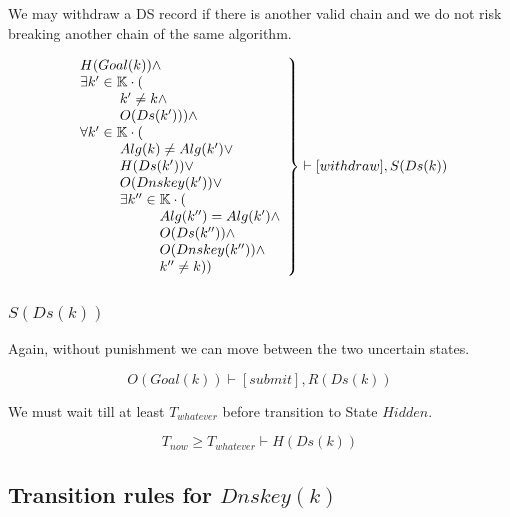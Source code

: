 \documentclass[twoside,english, a4paper]{article}
\newcommand{\mathbox}[1]{#1}
\begin{document}
\mathbox{

	We may withdraw a DS record if there is another valid chain and
	we do not risk breaking another chain of the same algorithm.

	\begin{equation}
		\left.
		\begin{array}{l}
\hskip 0cm			H(Goal(k)) \wedge \\
\hskip 0cm			\exists k' \in \mathbb{K} \cdot (\\
\hskip 1cm				k' \neq k \wedge \\
\hskip 1cm				O(Ds(k'))) \wedge \\
\hskip 0cm				\forall k' \in \mathbb{K} \cdot ( \\
\hskip 1cm					Alg(k) \neq Alg(k') \vee \\
\hskip 1cm					H(Ds(k')) \vee \\
\hskip 1cm					O(Dnskey(k')) \vee \\
\hskip 1cm					\exists k'' \in \mathbb{K} \cdot (\\
\hskip 2cm 						Alg(k'')=Alg(k') \wedge \\
\hskip 2cm 						O(Ds(k'')) \wedge \\
\hskip 2cm 						O(Dnskey(k'')) \wedge \\
\hskip 2cm 						k'' \neq k))
		\end{array}
		\right\} \vdash [withdraw], S(Ds(k)) \\
	\end{equation}
}

\subsubsection{$S(Ds(k))$}

\mathbox{

	Again, without punishment we can move between the two uncertain 
	states.

	\begin{equation}
			O(Goal(k)) \vdash [submit], R(Ds(k)) 
	\end{equation}

	We must wait till at least $T_{whatever}$ before transition to State 
	$Hidden$.
	
	\begin{equation}
			T_{now} \geq T_{whatever} \vdash H(Ds(k))
	\end{equation}
}


\subsection{Transition rules for $Dnskey(k)$}
\end{document}
